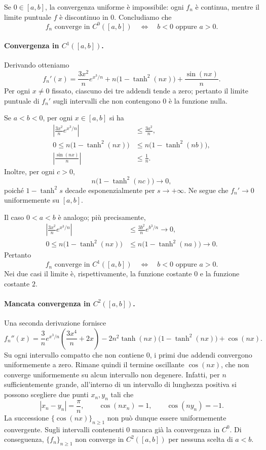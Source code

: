 \documentclass[a4paper]{article}
\begin{document}
\begin{radioactive}
\begin{snippetsolution}{}
Se \(0\in[a,b]\), la convergenza uniforme è impossibile: ogni \(f_n\) è continua, mentre il limite puntuale \(f\) è discontinuo in \(0\). Concludiamo che
\[
	f_n\text{ converge in }C^0([a,b])
	\quad\Longleftrightarrow\quad
	b<0\text{ oppure }a>0.
\]

\paragraph{Convergenza in \(C^1([a,b])\).}
Derivando otteniamo
\[
	f_n'(x)=\frac{3x^2}{n}e^{x^3/n}
	+n\bigl(1-\tanh^2(nx)\bigr)
	+\frac{\sin(nx)}{n}.
\]
Per ogni \(x\neq 0\) fissato, ciascuno dei tre addendi tende a zero; pertanto il limite puntuale di \(f_n'\) sugli intervalli che non contengono \(0\) è la funzione nulla.

Se \(a<b<0\), per ogni \(x\in[a,b]\) si ha
\begin{align*}
	\left|\frac{3x^2}{n}e^{x^3/n}\right|
	&\leq \frac{3a^2}{n},\\
	0\leq n\bigl(1-\tanh^2(nx)\bigr)
	&\leq n\bigl(1-\tanh^2(nb)\bigr),\\
	\left|\frac{\sin(nx)}{n}\right|
	&\leq \frac{1}{n}.
\end{align*}
Inoltre, per ogni \(c>0\),
\[
	n\bigl(1-\tanh^2(nc)\bigr)\longrightarrow 0,
\]
poiché \(1-\tanh^2 s\) decade esponenzialmente per \(s\to+\infty\). Ne segue che \(f_n'\to 0\) uniformemente su \([a,b]\).

Il caso \(0<a<b\) è analogo; più precisamente,
\begin{align*}
	\left|\frac{3x^2}{n}e^{x^3/n}\right|
	&\leq \frac{3b^2}{n}e^{b^3/n}\longrightarrow 0,\\
	0\leq n\bigl(1-\tanh^2(nx)\bigr)
	&\leq n\bigl(1-\tanh^2(na)\bigr)\longrightarrow 0.
\end{align*}
Pertanto
\[
	f_n\text{ converge in }C^1([a,b])
	\quad\Longleftrightarrow\quad
	b<0\text{ oppure }a>0.
\]
Nei due casi il limite è, rispettivamente, la funzione costante \(0\) e la funzione costante \(2\).

\paragraph{Mancata convergenza in \(C^2([a,b])\).}
Una seconda derivazione fornisce
\[
	f_n''(x)
	=\frac{3}{n}e^{x^3/n}\left(\frac{3x^4}{n}+2x\right)
	-2n^2\tanh(nx)\bigl(1-\tanh^2(nx)\bigr)
	+\cos(nx).
\]
Su ogni intervallo compatto che non contiene \(0\), i primi due addendi convergono uniformemente a zero. Rimane quindi il termine oscillante \(\cos(nx)\), che non converge uniformemente su alcun intervallo non degenere. Infatti, per \(n\) sufficientemente grande, all'interno di un intervallo di lunghezza positiva si possono scegliere due punti \(x_n,y_n\) tali che
\[
	|x_n-y_n|=\frac{\pi}{n},
	\qquad
	\cos(nx_n)=1,
	\qquad
	\cos(ny_n)=-1.
\]
La successione \(\{\cos(nx)\}_{n\geq1}\) non può dunque essere uniformemente convergente. Sugli intervalli contenenti \(0\) manca già la convergenza in \(C^0\). Di conseguenza, \(\{f_n\}_{n\geq1}\) non converge in \(C^2([a,b])\) per nessuna scelta di \(a<b\).


\end{snippetsolution}
\end{radioactive}
\end{document}
